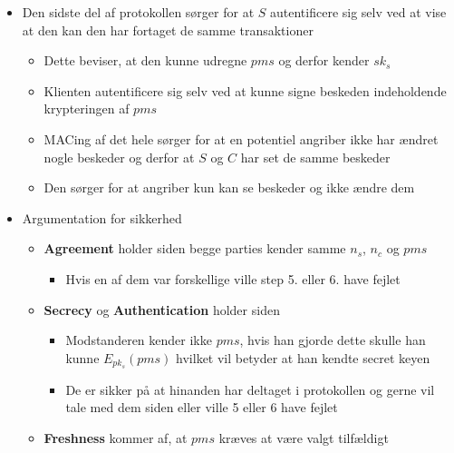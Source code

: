 \documentclass[a4, english]{article}
\begin{document}
\begin{itemize}
	\item Den sidste del af protokollen sørger for at $S$ autentificere sig selv ved at vise at den kan den har fortaget de samme transaktioner
  \begin{itemize}
  	\item Dette beviser, at den kunne udregne $pms$ og derfor kender $sk_s$  
    \item Klienten autentificere sig selv ved at kunne signe beskeden indeholdende krypteringen af $pms$ 
    \item MACing af det hele sørger for at en potentiel angriber ikke har ændret nogle beskeder og derfor at $S$ og $C$ har set de samme beskeder  
    \item Den sørger for at angriber kun kan se beskeder og ikke ændre dem
  \end{itemize}
  \item Argumentation for sikkerhed
  \begin{itemize}
  	\item \textbf{Agreement} holder siden begge parties kender samme $n_s$, $n_c$ og $pms$ 
    \begin{itemize}
    	\item Hvis en af dem var forskellige ville step 5. eller 6. have fejlet 
    \end{itemize}
    \item \textbf{Secrecy} og \textbf{Authentication} holder siden   
    \begin{itemize}
    	\item Modstanderen kender ikke $pms$, hvis han gjorde dette skulle han kunne $E_{pk_s}(pms)$ hvilket vil betyder at han kendte secret keyen
      \item De er sikker på at hinanden har deltaget i protokollen og gerne vil tale med dem siden eller ville 5 eller 6 have fejlet  
    \end{itemize}
    \item \textbf{Freshness} kommer af, at $pms$ kræves at være valgt tilfældigt
  \end{itemize}
\end{itemize}
\end{document}
